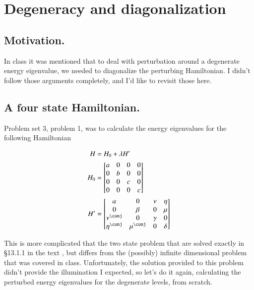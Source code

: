 %
%

\usepackage{easybmat}

\chapter{Degeneracy and diagonalization}
\label{chap:pertubationDegeneracy}
{}
\date{Nov 7, 2011}

\beginArtWithToc

\section{Motivation.}

In class it was mentioned that to deal with perturbation around a degenerate energy eigenvalue, we needed to diagonalize the perturbing Hamiltonian.  I didn't follow those arguments completely, and I'd like to revisit those here.

\section{A four state Hamiltonian.}

Problem set 3, problem 1, was to calculate the energy eigenvalues for the following Hamiltonian

\begin{align}\label{eqn:pertubationDegeneracy:10}
H &= H_0 + \lambda H' \\
H_0 &=
\begin{bmatrix}
a & 0 & 0 & 0 \\
0 & b & 0 & 0 \\
0 & 0 & c & 0 \\
0 & 0 & 0 & c 
\end{bmatrix} \\
H' &=
\begin{bmatrix}
\alpha 		& 0 		& \nu 		& \eta \\
0 		& \beta 	& 0 		& \mu \\
\nu^\conj 	& 0 		& \gamma 	& 0 \\
\eta^\conj 	& \mu^\conj 	& 0 		& \delta
\end{bmatrix}
\end{align}

This is more complicated that the two state problem that are solved exactly in \S 13.1.1 in the text \cite{desai2009quantum}, but differs from the (possibly) infinite dimensional problem that was covered in class.  Unfortunately, the solution provided to this problem didn't provide the illumination I expected, so let's do it again, calculating the perturbed energy eigenvalues for the degenerate levels, from scratch.

